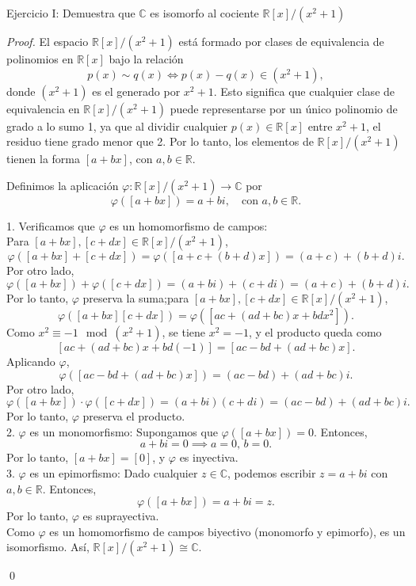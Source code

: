 \documentclass{article}
\theoremstyle{nonumberplain}
\begin{document}
Ejercicio I: Demuestra que \(\mathbb{C}\) es isomorfo al cociente \(\mathbb{R}[x]/(x^2 + 1)\) \\

\begin{proof}

El espacio \(\mathbb{R}[x]/(x^2 + 1)\) está formado por clases de equivalencia de polinomios en \(\mathbb{R}[x]\) bajo la relación \[ p(x) \sim q(x) \iff p(x) - q(x) \in (x^2 + 1), \]  
donde \((x^2 + 1)\) es el generado por \(x^2 + 1\). Esto significa que cualquier clase de equivalencia en \(\mathbb{R}[x]/(x^2 + 1)\) puede representarse por un único polinomio de grado a lo sumo 1, ya que al dividir cualquier \(p(x) \in \mathbb{R}[x]\) entre \(x^2 + 1\), el residuo tiene grado menor que 2. Por lo tanto, los elementos de \(\mathbb{R}[x]/(x^2 + 1)\) tienen la forma \([a + bx]\), con \(a, b \in \mathbb{R}\).  

Definimos la aplicación \(\varphi: \mathbb{R}[x]/(x^2 + 1) \to \mathbb{C}\) por  
\[
\varphi([a + bx]) = a + bi, \quad \text{con } a, b \in \mathbb{R}.
\]

1. Verificamos que \(\varphi\) es un homomorfismo de campos: \\
   Para \([a + bx], [c + dx] \in \mathbb{R}[x]/(x^2 + 1)\),  
     \[
     \varphi([a + bx] + [c + dx]) = \varphi([a + c + (b + d)x]) = (a + c) + (b + d)i.
     \]  
     Por otro lado,  
     \[
     \varphi([a + bx]) + \varphi([c + dx]) = (a + bi) + (c + di) = (a + c) + (b + d)i.
     \]  
     Por lo tanto, \(\varphi\) preserva la suma;para \([a + bx], [c + dx] \in \mathbb{R}[x]/(x^2 + 1)\),  
     \[
     \varphi([a + bx][c + dx]) = \varphi([ac + (ad + bc)x + bdx^2]).
     \]  
     Como \(x^2 \equiv -1 \mod (x^2 + 1)\), se tiene \(x^2 = -1\), y el producto queda como  
     \[
     [ac + (ad + bc)x + bd(-1)] = [ac - bd + (ad + bc)x].
     \]  
     Aplicando \(\varphi\),  
     \[
     \varphi([ac - bd + (ad + bc)x]) = (ac - bd) + (ad + bc)i.
     \]  
     Por otro lado,  
     \[
     \varphi([a + bx]) \cdot \varphi([c + dx]) = (a + bi)(c + di) = (ac - bd) + (ad + bc)i.
     \]  
     Por lo tanto, \(\varphi\) preserva el producto. \\

2. \(\varphi\) es un monomorfismo: 
   Supongamos que \(\varphi([a + bx]) = 0\). Entonces,  
   \[
   a + bi = 0 \implies a = 0, \, b = 0.
   \]  
   Por lo tanto, \([a + bx] = [0]\), y \(\varphi\) es inyectiva. \\

3. \(\varphi\) es un epimorfismo:
   Dado cualquier \(z \in \mathbb{C}\), podemos escribir \(z = a + bi\) con \(a, b \in \mathbb{R}\). Entonces,  
   \[
   \varphi([a + bx]) = a + bi = z.
   \]  
   Por lo tanto, \(\varphi\) es suprayectiva. \\

Como \(\varphi\) es un homomorfismo de campos biyectivo (monomorfo y epimorfo), es un isomorfismo. Así, \(\mathbb{R}[x]/(x^2 + 1) \cong \mathbb{C}\).  

\qed\end{proof}
\end{document}
